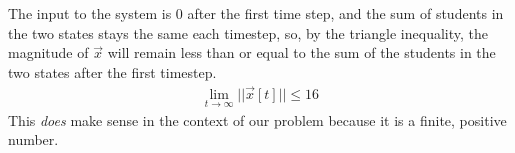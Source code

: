 \begin{enumerate}
{        The input to the system is 0 after the first time step, and the sum of students in the two states stays the same each timestep, so, by the triangle inequality, the magnitude of $\vec{x}$ will remain less than or equal to the sum of the students in the two states after the first timestep.
        \begin{align*}
            \lim_{t \to \infty} ||\vec{x}[t]|| \leq 16
        \end{align*}
        This \textit{does} make sense in the context of our problem because it is a finite, positive number.
    }

\end{enumerate}
